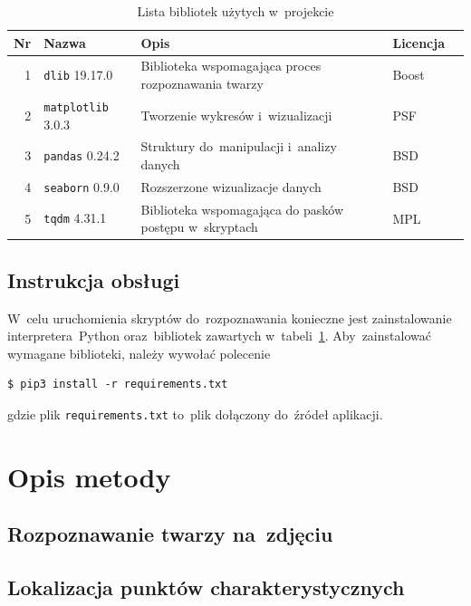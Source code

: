 \documentclass[11pt,a4paper]{article}
\begin{document}
\begin{table}[H]
    \begin{tabularx}{\textwidth}{|r|l|X|l|c|}
        \hline
        Nr & Nazwa & Opis & Licencja & \\
        \hline
        \hline
        1 & \texttt{dlib} 19.17.0 & Biblioteka wspomagająca proces rozpoznawania twarzy & Boost & \cite{king2003} \\
        \hline
        2 & \texttt{matplotlib} 3.0.3 & Tworzenie wykresów i~wizualizacji & PSF & \cite{hunter2007} \\
        \hline
        3 & \texttt{pandas} 0.24.2 & Struktury do~manipulacji i~analizy danych & BSD & \cite{mckinney2010} \\
        \hline
        4 & \texttt{seaborn} 0.9.0 & Rozszerzone wizualizacje danych & BSD & \cite{waskom2018} \\
        \hline
        5 & \texttt{tqdm} 4.31.1 & Biblioteka wspomagająca do pasków postępu w~skryptach & MPL & \cite{dacosta2016} \\
        \hline
    \end{tabularx}
    \caption{Lista bibliotek użytych w~projekcie}
    \label{tbl:libraries}
\end{table}

\subsection{Instrukcja obsługi}
\label{sec:manual}

W~celu uruchomienia skryptów do~rozpoznawania konieczne jest zainstalowanie interpretera~Python oraz~bibliotek zawartych w~tabeli~\ref{tbl:libraries}.
Aby~zainstalować wymagane biblioteki, należy wywołać polecenie
\begin{verbatim}
$ pip3 install -r requirements.txt
\end{verbatim}
gdzie plik \texttt{requirements.txt} to~plik dołączony do~źródeł aplikacji.

\section{Opis metody}

\subsection{Rozpoznawanie twarzy na~zdjęciu}

\subsection{Lokalizacja punktów charakterystycznych}
\end{document}
